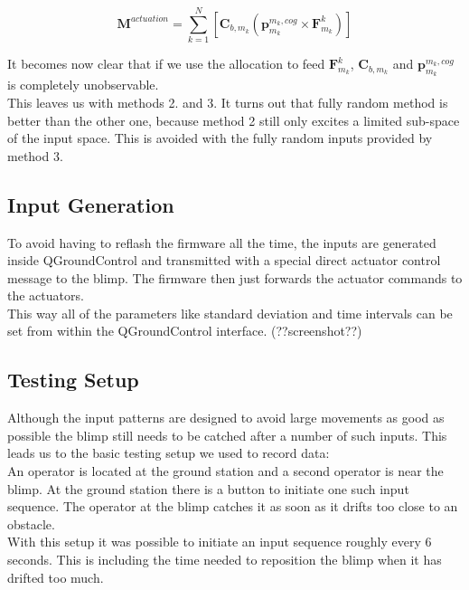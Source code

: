 \begin{equation}
\label{eq:m_actuation}
\mathbf{M}^{actuation} = \sum_{k=1}^N  \left[  \mathbf{C}_{b,m_k} \left( \mathbf{p}^{m_k,cog}_{m_k} \times \mathbf{F}^k_{m_k} \right)  \right]
\end{equation}

It becomes now clear that if we use the allocation to feed $\mathbf{F}^k_{m_k}$, $\mathbf{C}_{b,m_k}$ and $\mathbf{p}^{m_k,cog}_{m_k}$ is completely unobservable.\\
This leaves us with methods 2. and 3.
It turns out that fully random method is better than the other one, because method 2 still only excites a limited sub-space of the input space. This is avoided with the fully random inputs provided by method 3.\\

\subsection{Input Generation}
\label{sub:input_generation}
To avoid having to reflash the firmware all the time, the inputs are generated inside QGroundControl and transmitted with a special direct actuator control message to the blimp.
The firmware then just forwards the actuator commands to the actuators. \\
This way all of the parameters like standard deviation and time intervals can be set from within the QGroundControl interface. (??screenshot??)\\

\subsection{Testing Setup}
\label{sub:testing_setup}
Although the input patterns are designed to avoid large movements as good as possible the blimp still needs to be catched after a number of such inputs. This leads us to the basic testing setup we used to record data: \\
An operator is located at the ground station and a second operator is near the blimp.
At the ground station there is a button to initiate one such input sequence.
The operator at the blimp catches it as soon as it drifts too close to an obstacle. \\
With this setup it was possible to initiate an input sequence roughly every 6 seconds. 
This is including the time needed to reposition the blimp when it has drifted too much.

